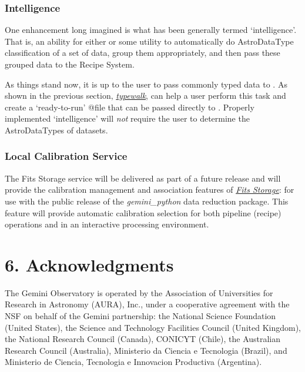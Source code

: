 \documentclass[letterpaper,10pt,english]{sphinxmanual}
\begin{document}
\subsection{Intelligence}
\label{discuss:intelligence}
One enhancement long imagined is what has been generally termed `intelligence'.
That is, an ability for either  or some utility to automatically do
AstroDataType classification of a set of data, group them appropriately, and
then pass these grouped data to the Recipe System.

As things stand now, it is up to the user to pass commonly typed data to
. As shown in the previous section, {\hyperref[supptools:typewalk]{\emph{typewalk}}}, 
can help a user perform this task and create a `ready-to-run' @file that can
be passed directly to . Properly implemented `intelligence' will
\emph{not} require the user to determine the AstroDataTypes of datasets.


\subsection{Local Calibration Service}
\label{discuss:local-calibration-service}
The Fits Storage service will be delivered as part of a future release and will
provide the calibration management and association features of {\hyperref[discuss:fitsstore]{\emph{Fits Storage}}}:
for use with the public release of the \emph{gemini\_python} data reduction package.
This feature will provide automatic calibration selection for both pipeline
(recipe) operations and in an interactive processing environment.


\chapter{6. Acknowledgments}
\label{ack::doc}\label{ack:acknowledgments}
The Gemini Observatory is operated by the Association of Universities for
Research in Astronomy (AURA), Inc., under a cooperative agreement with the NSF on
behalf of the Gemini partnership: the National Science Foundation
(United States), the Science and Technology Facilities Council (United Kingdom),
the National Research Council (Canada), CONICYT (Chile), the Australian
Research Council (Australia), Ministerio da Ciencia e Tecnologia (Brazil),
and Ministerio de Ciencia, Tecnologia e Innovacion Productiva (Argentina).
\appendix
\noappendicestocpagenum
\addappheadtotoc
\end{document}
